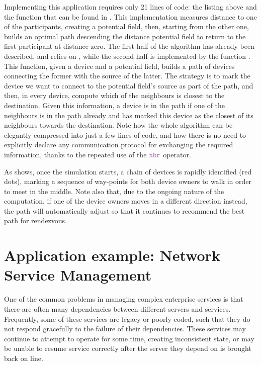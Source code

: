 \documentclass[12pt,a4paper,twoside,openright]{book}
\begin{document}
Implementing this application requires only 21 lines of code: the listing above and the function \texttt{} that can be found in .
%
This implementation measures distance to one of the participants, creating a potential field, then, starting from the other one, builds an optimal path descending the distance potential field to return to the first participant at distance zero.
%
The first half of the algorithm has already been described, and relies on \texttt{}, while the second half is implemented by the function \texttt{}.
%
This function, given a device and a potential field, builds a path of devices connecting the former with the source of the latter.
%
The strategy is to mark the device we want to connect to the potential field's source as part of the path, and then, in every device, compute which of the neighbours is closest to the destination.
%
Given this information, a device is in the path if one of the neighbours is in the path already and has marked this device as the closest of its neighbours towards the destination.
%
Note how the whole algorithm can be elegantly compressed into just a few lines of code, and how there is no need to explicitly declare any communication protocol for exchanging the required information, thanks to the repeated use of the $\nbrK$ operator.

As  shows, once the simulation starts, a chain of devices is rapidly identified (red dots), marking a sequence of way-points for both device owners to walk in order to meet in the middle.
%
Note also that, due to the ongoing nature of the computation, if one of the device owners moves in a different direction instead, the path will automatically adjust so that it continues to recommend the best path for rendezvous.

\section{Application example: Network Service Management}
\label{protelis-network-service}

One of the common problems in managing complex enterprise services is that there are often many dependencies between different servers and services.
%
Frequently, some of these services are legacy or poorly coded, such that they do not respond gracefully to the failure of their dependencies.  These services may continue to attempt to operate for some time, creating inconsistent state, or may be unable to resume service correctly after the server they depend on is brought back on line.
\end{document}
